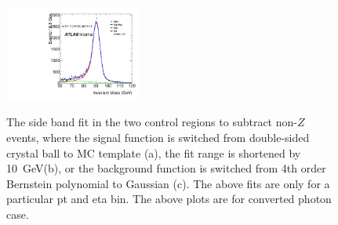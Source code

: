 \begin{figure}[!htbp]
{\includegraphics[width=0.40\textwidth]{figures/egammafakes/converted_ph/syst_bkg_var/Postfit_Zpeak_PtBin1_EtaBin1_zeg.pdf}\label{fig:egammafake_fit_bkg_converted}
}
\caption [] {The side band fit in the two control regions to subtract non-$Z$ events, where the signal function is switched from double-sided crystal ball to MC template (a), the fit range is shortened by 10~GeV(b), or the background function is switched from 4th order Bernstein polynomial to Gaussian (c). The above fits are only for a particular pt and eta bin. The above plots are for converted photon case.}
\label{fig:egammafake_fit_syst_converted}
\end{figure} 

